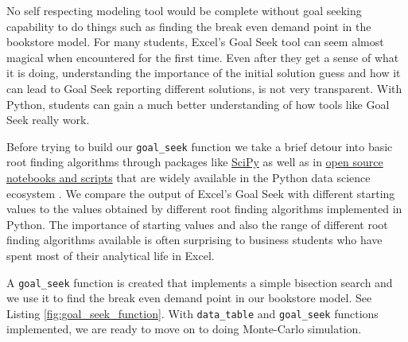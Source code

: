 \documentclass[ited]{informs3}                      %
\newcommand{\code}[1]{\texttt{#1}}
\begin{document}
No self respecting modeling tool would be complete without goal seeking capability to do things such as finding the break even demand point in the bookstore model. For many students, Excel's Goal Seek tool can seem almost magical when encountered for the first time. Even after they get a sense of what it is doing, understanding the importance of the initial solution guess and how it can lead to Goal Seek reporting different solutions, is not very transparent. With Python, students can gain a much better understanding of how tools like Goal Seek really work. 


Before trying to build our \code{goal\_seek} function we take a brief detour into basic root finding algorithms through packages like \href{https://docs.scipy.org/doc/scipy/tutorial/optimize.html#root-finding}{SciPy} \citep{2020SciPy-NMeth} as well as in \href{https://github.com/patrickwalls/mathematical-python/}{open source notebooks and scripts} that are widely available in the Python data science ecosystem \citep{wallsMathematicalPython2023}. We compare the output of Excel's Goal Seek with different starting values to the values obtained by different root finding algorithms implemented in Python. The importance of starting values and also the range of different root finding algorithms available is often surprising to business students who have spent most of their analytical life in Excel.

A \code{goal\_seek} function is created that implements a simple bisection search and we use it to find the break even demand point in our bookstore model. See Listing \ref{fig:goal_seek_function}. With \code{data\_table} and \code{goal\_seek} functions implemented, we are ready to move on to doing Monte-Carlo simulation.
\end{document}
